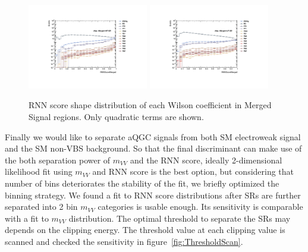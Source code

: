 \begin{figure}[]
    \centering
   \includegraphics[width=0.47\textwidth]{figures/aQGC/RNNScoreMerged_SR_HP_aQGC.pdf}
   \includegraphics[width=0.47\textwidth]{figures/aQGC/RNNScoreMerged_SR_LP_aQGC.pdf}
    \caption{RNN score shape distribution of each Wilson coefficient in Merged Signal regions. Only quadratic terms are shown.}
    \label{fig:2lepaQGCshapeRNNh}
\end{figure}
Finally we would like to separate aQGC signals from both SM electroweak signal and the SM non-VBS background.
So that the final discriminant can make use of the both separation power of $m_{VV}$ and the RNN score, ideally 2-dimensional likelihood fit using $m_{VV}$ and RNN score is the best option, but considering that number of bins deteriorates the stability of the fit, we briefly optimized the binning strategy.
We found a fit to RNN score distributions after SRs are further separated into 2 bin $m_{VV}$ categories is usable enough.
Its sensitivity is comparable with a fit to $m_{VV}$ distribution.
The optimal threshold to separate the SRs may depends on the clipping energy.
The threshold value at each clipping value is scanned and checked the sensitivity in figure~\ref{fig:ThresholdScan}.
